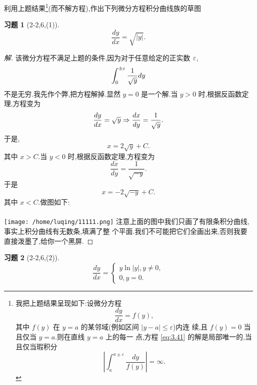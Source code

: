 \documentclass[a4paper, 12pt]{article} %
\newtheorem*{cdtheorem}{习题}
\newenvironment{exercise}
{\bigskip\begin{mdframed}[backgroundcolor=gray!40,rightline=false,leftline=false,topline=false,bottomline=false]\begin{cdtheorem}}
    {\end{cdtheorem}\end{mdframed}\bigskip}
\begin{document}
利用上题结果\footnote{我把上题结果呈现如下:设微分方程
  \begin{equation}
    \label{eq:3.41}
    \frac{dy}{dx}=f(y),
  \end{equation}
  其中 $f(y)$ 在 $y=a$ 的某邻域(例如区间 $|y-a|\leq\varepsilon$)内连
  续,且 $f(y)=0$ 当且仅当 $y=a$.则在直线 $y=a$ 上的每一
  点,方程 \eqref{eq:3.41} 的解是局部唯一的,当且仅当瑕积分
$$
|\int_a^{a\pm \varepsilon}\frac{dy}{f(y)}|=\infty.
$$}(而不解方程),作出下列微分方程积分曲线族的草图
\begin{exercise}[2-2,6,(1)]
$$
\frac{dy}{dx}=\sqrt{|y|}.
$$
\end{exercise}
\begin{proof}[解]
该微分方程不满足上题的条件,因为对于任意给定的正实数 $\varepsilon$,
$$
\int_0^{\pm \varepsilon} \frac{1}{\sqrt{y}}dy
$$
不是无穷.我先作个弊,把方程解掉.显然 $y=0$ 是一个解.当 $y>0$ 时,根据反函数定理,方程变为
$$
\frac{dy}{dx}=\sqrt{y}\Rightarrow \frac{dx}{dy}=\frac{1}{\sqrt{y}}.
$$
于是,
$$
x=2\sqrt{y}+C.
$$
其中 $x>C$.当 $y<0$ 时,根据反函数定理,方程变为
$$
\frac{dx}{dy}=\frac{1}{\sqrt{-y}}.
$$
于是
$$
x=-2 \sqrt{-y}+C.
$$
其中 $x<C$.做图如下:\\\\
\texttt{[image: /home/luqing/11111.png]}
注意上面的图中我们只画了有限条积分曲线,事实上积分曲线有无数条,填满了整
个平面.我们不可能把它们全画出来,否则我要直接泼墨了,给你一个黑屏.
\end{proof}
\begin{exercise}[2-2,6,(2)]
$$
\frac{dy}{dx}=
\begin{cases}
  y\ln|y|,y\neq 0,\\
0,y=0.
\end{cases}
$$
\end{exercise}
\end{document}
